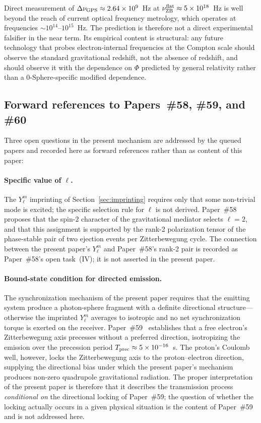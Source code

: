 \documentclass[%
 reprint, amsmath,amssymb, aps, prb, ]{revtex4-2}
\numberwithin{equation}{section}
\begin{document}
Direct measurement of $\Delta\nu_{\rm GPS} \approx 2.64\times 10^9$~Hz at $\nu_{\rm ZB}^{\rm flat} \approx 5\times 10^{18}$~Hz is well beyond the reach of current optical frequency metrology, which operates at frequencies $\sim 10^{14}$--$10^{15}$~Hz. The prediction is therefore not a direct experimental falsifier in the near term. Its empirical content is structural: any future technology that probes electron-internal frequencies at the Compton scale should observe the standard gravitational redshift, not the absence of redshift, and should observe it with the dependence on $\Phi$ predicted by general relativity rather than a 0-Sphere-specific modified dependence.

\subsection{Forward references to Papers~\#58, \#59, and \#60}

Three open questions in the present mechanism are addressed by the queued papers and recorded here as forward references rather than as content of this paper:

\paragraph{Specific value of $\ell$.}
The $Y_\ell^m$ imprinting of Section~\ref{sec:imprinting} requires only that some non-trivial mode is excited; the specific selection rule for $\ell$ is not derived. Paper~\#58~\cite{hanamura58} proposes that the spin-2 character of the gravitational mediator selects $\ell = 2$, and that this assignment is supported by the rank-2 polarization tensor of the phase-stable pair of two ejection events per Zitterbewegung cycle. The connection between the present paper's $Y_\ell^m$ and Paper~\#58's rank-2 pair is recorded as Paper~\#58's open task~(IV); it is not asserted in the present paper.

\paragraph{Bound-state condition for directed emission.}
The synchronization mechanism of the present paper requires that the emitting system produce a photon-sphere fragment with a definite directional structure---otherwise the imprinted $Y_\ell^m$ averages to isotropic and no net synchronization torque is exerted on the receiver. Paper~\#59~\cite{hanamura59} establishes that a free electron's Zitterbewegung axis precesses without a preferred direction, isotropizing the emission over the precession period $T_{\rm prec} \approx 5\times 10^{-16}$~s. The proton's Coulomb well, however, locks the Zitterbewegung axis to the proton--electron direction, supplying the directional bias under which the present paper's mechanism produces non-zero quadrupole gravitational radiation. The proper interpretation of the present paper is therefore that it describes the transmission process \emph{conditional on} the directional locking of Paper~\#59; the question of whether the locking actually occurs in a given physical situation is the content of Paper~\#59 and is not addressed here.
\end{document}
